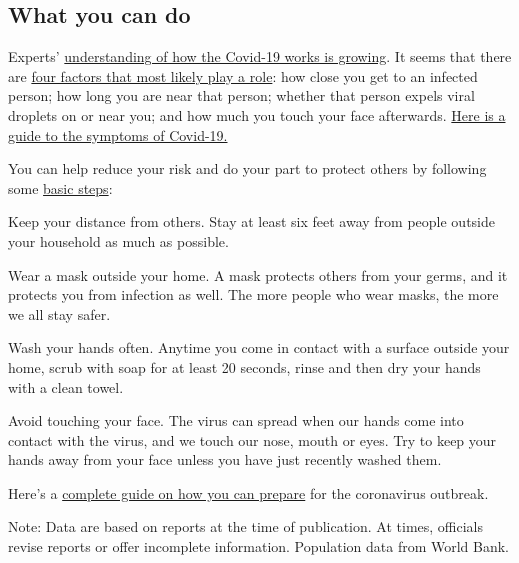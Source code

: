 \hypertarget{what-you-can-do}{%
\subsection{What you can do}\label{what-you-can-do}}

Experts'
\href{https://www.nytimes3xbfgragh.onion/2020/06/02/health/coronavirus-profile-covid.html}{understanding
of how the Covid-19 works is growing}. It seems that there are
\href{https://www.nytimes3xbfgragh.onion/article/coronavirus-how-it-spreads.html}{four
factors that most likely play a role}: how close you get to an infected
person; how long you are near that person; whether that person expels
viral droplets on or near you; and how much you touch your face
afterwards.
\href{https://www.nytimes3xbfgragh.onion/interactive/2020/08/05/well/covid-19-symptoms.html}{Here
is a guide to the symptoms of Covid-19.}

You can help reduce your risk and do your part to protect others by
following some
\href{https://www.nytimes3xbfgragh.onion/article/prepare-for-coronavirus.html}{basic
steps}:

Keep your distance from others. Stay at least six feet away from people
outside your household as much as possible.

Wear a mask outside your home. A mask protects others from your germs,
and it protects you from infection as well. The more people who wear
masks, the more we all stay safer.

Wash your hands often. Anytime you come in contact with a surface
outside your home, scrub with soap for at least 20 seconds, rinse and
then dry your hands with a clean towel.

Avoid touching your face. The virus can spread when our hands come into
contact with the virus, and we touch our nose, mouth or eyes. Try to
keep your hands away from your face unless you have just recently washed
them.

Here's a
\href{https://www.nytimes3xbfgragh.onion/interactive/2020/world/coronavirus-tips-advice.html}{complete
guide on how you can prepare} for the coronavirus outbreak.

Note: Data are based on reports at the time of publication. At times,
officials revise reports or offer incomplete information. Population
data from World Bank.


